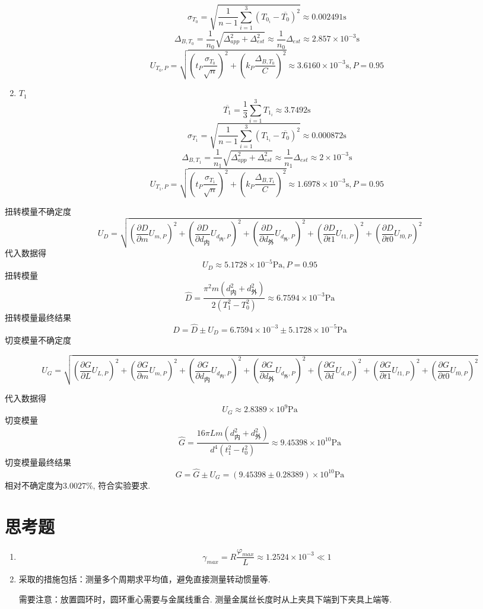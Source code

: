 \documentclass[UTF8]{ctexart}
\begin{document}
\begin{enumerate}
    \[\sigma _{T_0}=\sqrt{\frac{1}{n-1}\sum_{i=1}^{3}\left(T_{0_i}-\overline{T_0}\right)^2}\approx 0.002491\mathrm{s}\] 
    \[\Delta_{B,T_0}=\frac{1}{n_0}\sqrt{\Delta_{app}^2+\Delta_{est}^2}\approx \frac{1}{n_0}\Delta_{est}\approx 2.857\times 10^{-3}\mathrm{s}\]
    \[U_{T_0,P}=\sqrt{\left(t_P\frac{\sigma_{T_0}}{\sqrt{n}}\right)^2+\left(k_P\frac{\Delta_{B,T_0}}{C}\right)^2}\approx 3.6160\times 10^{-3}\mathrm{s}, P=0.95\]
    \item $T_1$
    \[\overline{T_1}=\frac{1}{3}\sum_{i = 1}^{3} T_{1_i}\approx 3.7492\mathrm{s}\]
    \[\sigma _{T_1}=\sqrt{\frac{1}{n-1}\sum_{i=1}^{3}\left(T_{1_i}-\overline{T_0}\right)^2}\approx 0.000872\mathrm{s}\] 
    \[\Delta_{B,T_1}=\frac{1}{n_1}\sqrt{\Delta_{app}^2+\Delta_{est}^2}\approx \frac{1}{n_1}\Delta_{est}\approx 2\times 10^{-3}\mathrm{s}\]
    \[U_{T_1,P}=\sqrt{\left(t_P\frac{\sigma_{T_1}}{\sqrt{n}}\right)^2+\left(k_P\frac{\Delta_{B,T_1}}{C}\right)^2}\approx 1.6978\times 10^{-3}\mathrm{s}, P=0.95\]
\end{enumerate}
扭转模量不确定度
\[U_D=\sqrt{\left(\frac{\partial D}{\partial m}U_{m,P}\right)^2+\left(\frac{\partial D}{\partial d_\text{内}}U_{d_\text{内},P}\right)^2+\left(\frac{\partial D}{\partial d_\text{外}}U_{d_\text{外},P}\right)^2+\left(\frac{\partial D}{\partial t1}U_{t1,P}\right)^2+\left(\frac{\partial D}{\partial t0}U_{t0,P}\right)^2}\]
代入数据得
\[U_D\approx 5.1728\times 10^{-5}\mathrm{Pa}, P=0.95\]
扭转模量
\[\hat{D}=\frac{\pi^2m\left(d_\text{内}^2+d_\text{外}^2\right)}{2\left(T_1^2-T_0^2\right)}\approx 6.7594\times 10^{-3}\mathrm{Pa}\]
扭转模量最终结果
\[D=\hat{D}\pm U_D=6.7594\times 10^{-3}\pm 5.1728\times 10^{-5}\mathrm{Pa}\]
切变模量不确定度
\begin{small}
    \[U_G=\sqrt{\left(\frac{\partial G}{\partial L}U_{L,P}\right)^2+\left(\frac{\partial G}{\partial m}U_{m,P}\right)^2+\left(\frac{\partial G}{\partial d_\text{内}}U_{d_\text{内},P}\right)^2+\left(\frac{\partial G}{\partial d_\text{外}}U_{d_\text{外},P}\right)^2+\left(\frac{\partial G}{\partial d}U_{d,P}\right)^2+\left(\frac{\partial G}{\partial t1}U_{t1,P}\right)^2+\left(\frac{\partial G}{\partial t0}U_{t0,P}\right)^2}\]
\end{small}
代入数据得
\[U_G\approx 2.8389\times 10^9\mathrm{Pa}\]
切变模量
\[\hat{G}=\frac{16\pi Lm\left(d_\text{内}^2+d_\text{外}^2\right)}{d^4\left(t_1^2-t_0^2\right)}\approx 9.45398\times 10^{10}\mathrm{Pa}\]
切变模量最终结果
\[G=\hat{G}\pm U_G=\left(9.45398\pm 0.28389\right)\times 10^{10}\mathrm{Pa}\]
相对不确定度为$3.0027\%$, 符合实验要求.
\section{思考题}
\begin{enumerate}
    \item 
    \[\gamma_{max}=R\frac{\varphi_{max}}{L} \approx 1.2524\times 10^{-3}\ll 1\]
    \item 采取的措施包括：测量多个周期求平均值，避免直接测量转动惯量等. 
    
    需要注意：放置圆环时，圆环重心需要与金属线重合. 测量金属丝长度时从上夹具下端到下夹具上端等.
\end{enumerate}


\end{document}
